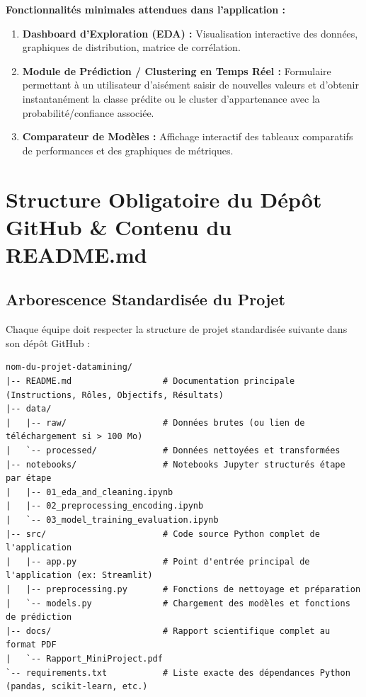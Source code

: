 \documentclass[11pt,a4paper]{article}
\begin{document}
\textbf{Fonctionnalités minimales attendues dans l'application :}
\begin{enumerate}
    \item \textbf{Dashboard d'Exploration (EDA) :} Visualisation interactive des données, graphiques de distribution, matrice de corrélation.
    \item \textbf{Module de Prédiction / Clustering en Temps Réel :} Formulaire permettant à un utilisateur d'aisément saisir de nouvelles valeurs et d'obtenir instantanément la classe prédite ou le cluster d'appartenance avec la probabilité/confiance associée.
    \item \textbf{Comparateur de Modèles :} Affichage interactif des tableaux comparatifs de performances et des graphiques de métriques.
\end{enumerate}

\section{Structure Obligatoire du Dépôt GitHub \& Contenu du README.md}

\subsection{Arborescence Standardisée du Projet}
Chaque équipe doit respecter la structure de projet standardisée suivante dans son dépôt GitHub :

\begin{verbatim}
nom-du-projet-datamining/
|-- README.md                  # Documentation principale (Instructions, Rôles, Objectifs, Résultats)
|-- data/
|   |-- raw/                   # Données brutes (ou lien de téléchargement si > 100 Mo)
|   `-- processed/             # Données nettoyées et transformées
|-- notebooks/                 # Notebooks Jupyter structurés étape par étape
|   |-- 01_eda_and_cleaning.ipynb
|   |-- 02_preprocessing_encoding.ipynb
|   `-- 03_model_training_evaluation.ipynb
|-- src/                       # Code source Python complet de l'application
|   |-- app.py                 # Point d'entrée principal de l'application (ex: Streamlit)
|   |-- preprocessing.py       # Fonctions de nettoyage et préparation
|   `-- models.py              # Chargement des modèles et fonctions de prédiction
|-- docs/                      # Rapport scientifique complet au format PDF
|   `-- Rapport_MiniProject.pdf
`-- requirements.txt           # Liste exacte des dépendances Python (pandas, scikit-learn, etc.)
\end{verbatim}
\end{document}
